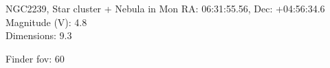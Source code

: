 \begin{block}{NGC2239, Star cluster + Nebula in Mon}
    RA: 06:31:55.56, Dec: +04:56:34.6 \\ 
    Magnitude (V): 4.8 \\ 
    Dimensions: 9.3 

    Finder fov: 60 
\end{block}